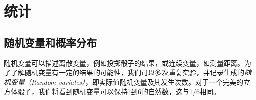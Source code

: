 

\chapter{统计}
\label{chap:statistics}
\section {随机变量和概率分布} 
\label{sec:pdfs}
随机变量可以描述离散变量，例如投掷骰子的结果，或连续变量，如测量距离。为了了解随机变量有一定的结果的可能性，我们可以多次重复实验，并记录生成的\emph{随机变量（Random variates）}，即实际值随机变量及其发生次数。对于一个完美的立方体骰子，我们将看到随机变量可以保持1到6的自然数，这与1/6相同。

